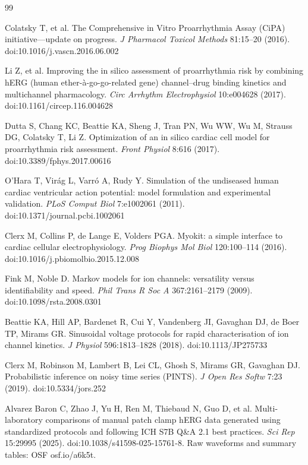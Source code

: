 \documentclass[11pt,a4paper]{article}
\begin{document}
\begin{thebibliography}{99}

 Colatsky T, et al. The Comprehensive in Vitro
Proarrhythmia Assay (CiPA) initiative---update on progress. \emph{J Pharmacol
Toxicol Methods} 81:15--20 (2016). doi:10.1016/j.vascn.2016.06.002

 Li Z, et al. Improving the in silico assessment of
proarrhythmia risk by combining hERG (human ether-\`a-go-go-related gene)
channel--drug binding kinetics and multichannel pharmacology. \emph{Circ
Arrhythm Electrophysiol} 10:e004628 (2017). doi:10.1161/circep.116.004628

 Dutta S, Chang KC, Beattie KA, Sheng J, Tran PN, Wu WW,
Wu M, Strauss DG, Colatsky T, Li Z. Optimization of an in silico cardiac cell
model for proarrhythmia risk assessment. \emph{Front Physiol} 8:616 (2017).
doi:10.3389/fphys.2017.00616

 O'Hara T, Vir\'ag L, Varr\'o A, Rudy Y. Simulation of the
undiseased human cardiac ventricular action potential: model formulation and
experimental validation. \emph{PLoS Comput Biol} 7:e1002061 (2011).
doi:10.1371/journal.pcbi.1002061

 Clerx M, Collins P, de Lange E, Volders PGA.
Myokit: a simple interface to cardiac cellular electrophysiology.
\emph{Prog Biophys Mol Biol} 120:100--114 (2016).
doi:10.1016/j.pbiomolbio.2015.12.008

 Fink M, Noble D. Markov models for ion channels: versatility
versus identifiability and speed. \emph{Phil Trans R Soc A} 367:2161--2179
(2009). doi:10.1098/rsta.2008.0301

 Beattie KA, Hill AP, Bardenet R, Cui Y, Vandenberg JI,
Gavaghan DJ, de Boer TP, Mirams GR. Sinusoidal voltage protocols for rapid
characterisation of ion channel kinetics. \emph{J Physiol} 596:1813--1828
(2018). doi:10.1113/JP275733

 Clerx M, Robinson M, Lambert B, Lei CL, Ghosh S, Mirams GR,
Gavaghan DJ. Probabilistic inference on noisy time series (PINTS).
\emph{J Open Res Softw} 7:23 (2019). doi:10.5334/jors.252

 Alvarez Baron C, Zhao J, Yu H, Ren M, Thiebaud N,
Guo D, et al. Multi-laboratory comparisons of manual patch clamp hERG data
generated using standardized protocols and following ICH S7B Q\&A 2.1 best
practices. \emph{Sci Rep} 15:29995 (2025). doi:10.1038/s41598-025-15761-8.
Raw waveforms and summary tables: OSF osf.io/a6k5t.


\end{thebibliography}
\end{document}
